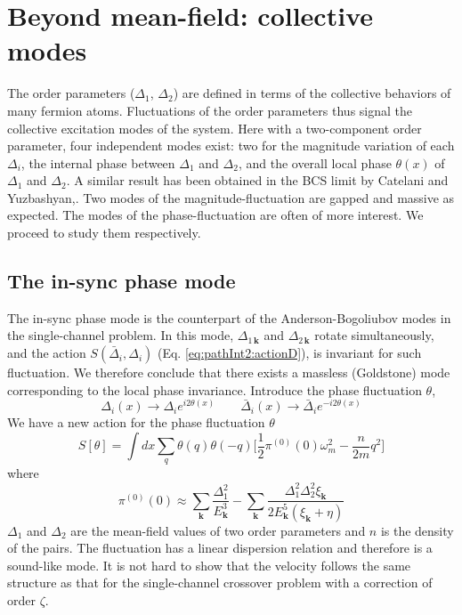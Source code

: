 \documentclass[reprint,pra]{revtex4-1}
\newcommand{\vk}{\ensuremath{\mathbf{k}}}
\newcommand{\nth}[1]{\ensuremath{\frac{1}{#1}}}
\begin{document}
\section{Beyond mean-field:  collective modes\label{sec:bosonic}}
The order parameters ($\Delta_{1}$, $\Delta_{2}$) are defined in terms of the collective behaviors of many fermion atoms.  Fluctuations of the order parameters thus signal the collective excitation modes of the system. Here with a two-component order parameter, four independent modes exist:   two for the magnitude variation of each $\Delta_i$, the internal phase between $\Delta_1$ and $\Delta_2$, and the overall local phase $\theta(x)$ of $\Delta_1$ and $\Delta_2$.  %
A similar result has been obtained in the BCS limit by Catelani and Yuzbashyan,\cite{Catelani}.
Two modes of the magnitude-fluctuation are gapped and massive as expected.  The modes of the phase-fluctuation are often of more interest.
We proceed to study them respectively.  

\subsection{The in-sync phase mode}
The in-sync phase mode is the counterpart of the Anderson-Bogoliubov modes in the single-channel problem\cite{RanderiaBEC, Nagaosa}. %
In this mode,  $\Delta_{1\,\vk}$ and $\Delta_{2\,\vk}$ rotate simultaneously, and the action $S(\bar{\Delta}_i,\Delta_i)$ (Eq. \ref{eq:pathInt2:actionD}), is invariant for such fluctuation.  
 We therefore conclude that there exists a massless (Goldstone) mode corresponding to the local phase invariance.  Introduce the phase fluctuation $\theta$, 
\begin{equation*}
\Delta_{i}(x)\rightarrow{}\Delta_{i}e^{i2\theta(x)}\qquad{}
\bar{\Delta}_{i}(x)\rightarrow{}\bar{\Delta}_{i}e^{-i2\theta(x)}
\end{equation*}
We have a new action for the phase fluctuation $\theta$
\begin{equation}
S[\theta]=\int{dx}\sum_{q}\theta(q)\theta(-q)\big[\nth{2}\pi^{(0)}(0)\omega_m^2-\frac{n}{2m}q^2\big]
\end{equation}
where 
\begin{equation}
\pi^{(0)}(0)\approx\sum_{\vk}\frac{\Delta_{1}^{2}}{E_{\vk}^{3}}
	-\sum_{\vk}\frac{\Delta_{1}^{2}\Delta_{2}^{2}\xi_{\vk}}{2E_{\vk}^{5}(\xi_{\vk}+\eta)}
\label{eq:pathInt2:pi0}
\end{equation}
$\Delta_1$ and $\Delta_2$ are the mean-field values of two order parameters and $n$ is the density of the pairs. 
The fluctuation has a linear dispersion relation and therefore is a sound-like mode.    It is not hard to show that the velocity follows the same structure as that for the single-channel crossover problem  with a correction of order  $\zeta$.
\end{document}
